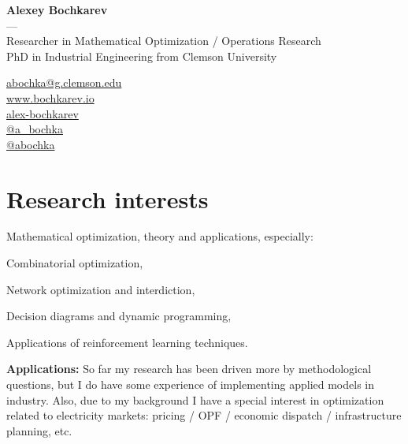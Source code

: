 \documentclass[11pt]{article} \usepackage{geometry} %
\begin{document}
  \begin{minipage}[c]{0.74\textwidth}
    \centering
    {\LARGE \textbf{Alexey Bochkarev}}\\
    ---\\ 
    Researcher in Mathematical Optimization / Operations Research\\
    PhD in Industrial Engineering from Clemson University
  \end{minipage}\hfill%
  \begin{minipage}{0.26\textwidth}
    \faEnvelope \href{mailto:abochka@g.clemson.edu}{abochka@g.clemson.edu}\\
    \faGlobe \href{https://www.bochkarev.io}{www.bochkarev.io}\\
    \faGithub \href{https://github.com/alex-bochkarev}{alex-bochkarev}\\
    \faTwitter \href{https://twitter.com/a_bochka}{@a\_bochka}\\
    \faTelegram \href{https://t.me/abochka}{@abochka}
  \end{minipage}
  
  \vspace{1.0em}
  \section*{Research interests}
  Mathematical optimization, theory and applications, especially:\vspace{0.3em}
  \begin{itemize}
    \begin{minipage}{0.5\linewidth}
      \item Combinatorial optimization,
      \item Network optimization and interdiction,
    \end{minipage}
    \begin{minipage}{0.5\linewidth}
      \item Decision diagrams and dynamic programming,
      \item Applications of reinforcement learning techniques.
    \end{minipage}
  \end{itemize}

  \noindent
  \textbf{Applications:} So far my research has been driven more by
  methodological questions, but I do have some experience of
  implementing applied models in industry. Also, due to my background I have a
  special interest in optimization related to electricity markets:
  pricing / OPF / economic dispatch / infrastructure planning, etc.\vspace{1.5em}
\end{document}
